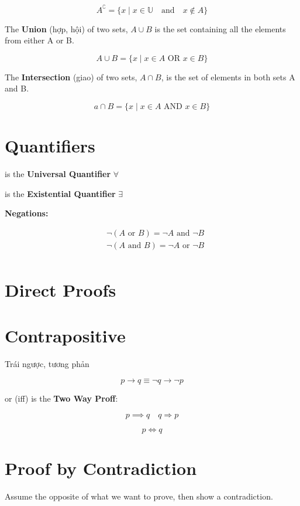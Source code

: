 \[A^\complement = \{x \mid x \in \mathbb{U} \quad \text{and} \quad x \not\in A \}\]

The \textbf{Union} (hợp, hội) of two sets, $A \cup B$ is the set containing all the elements from either A or B.

\[A \cup B = \{ x \mid x \in A \text{ OR } x \in B \}\]

The \textbf{Intersection} (giao) of two sets, $A \cap B$, is the set of elements in both sets A and B.

\[a \cap B = \{ x \mid x\in A \text{ AND } x\in B \}\]

\section{Quantifiers}

 is the \textbf{Universal Quantifier} $\forall$

 is the \textbf{Existential Quantifier} $\exists$

\textbf{Negations:}

\[
\begin{aligned}
  &\neg(A \text{ or } B) = \neg A \text{ and } \neg B\\
  &\neg(A \text{ and } B)= \neg A \text{ or } \neg B\\
\end{aligned}
\]


\section{Direct Proofs}

\section{Contrapositive}

Trái ngược, tương phản

\[p \rightarrow q \equiv \neg q \rightarrow \neg p\]

 or (iff) is the \textbf{Two Way Proff}:

\[p \implies q \quad q \Longrightarrow p\]

\[p \iff q\]

\section{Proof by Contradiction}

Assume the opposite of what we want to prove, then show a contradiction.

